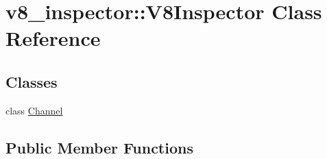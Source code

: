 \hypertarget{classv8__inspector_1_1V8Inspector}{}\section{v8\+\_\+inspector\+:\+:V8\+Inspector Class Reference}
\label{classv8__inspector_1_1V8Inspector}
\subsection*{Classes}
\begin{DoxyCompactItemize}
\item 
class \mbox{\hyperlink{classv8__inspector_1_1V8Inspector_1_1Channel}{Channel}}
\end{DoxyCompactItemize}
\subsection*{Public Member Functions}
